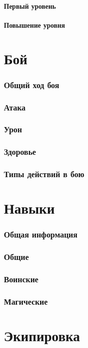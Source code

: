 \documentclass[10pt,twoside,twocolumn,openany]{book}
\begin{document}
\subsection{Первый уровень}
\lipsum[1]
\subsection{Повышение уровня}
\lipsum[1]

\part{Бой}
\section{Общий ход боя}
\lipsum[1]
\section{Атака}
\lipsum[1]
\section{Урон}
\lipsum[1]
\section{Здоровье}
\lipsum[1]
\section{Типы действий в бою}
\lipsum[1]

\part{Навыки}
\section{Общая информация}
\lipsum[1]
\section{Общие}
\lipsum[1]
\section{Воинские}
\lipsum[1]
\section{Магические}
\lipsum[1]

\part{Экипировка}
\end{document}

